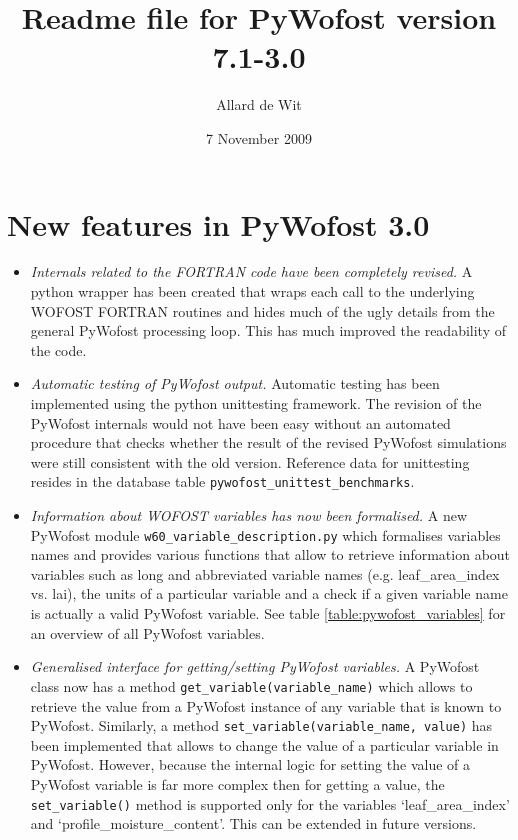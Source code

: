 \documentclass[12pt]{article}
\title{Readme file for PyWofost version 7.1-3.0}
\author{Allard de Wit}
\date{7 November 2009} %
\begin{document}
\maketitle
\tableofcontents

\section{New features in PyWofost 3.0}
\begin{itemize}
\item \emph{Internals related to the FORTRAN code have been completely revised.} A python wrapper has been created that wraps each call to the underlying WOFOST FORTRAN routines and hides much of the ugly details from the general PyWofost processing loop. This has much improved the readability of the code.
\item \emph{Automatic testing of PyWofost output.} Automatic testing has been implemented using the python unittesting framework. The revision of the PyWofost internals would not have been easy without an automated procedure that checks whether the result of the revised PyWofost simulations were still consistent with the old version. Reference data for unittesting resides in the database table \texttt{pywofost\_unittest\_benchmarks}.
\item \emph{Information about WOFOST variables has now been formalised.} A new PyWofost module \texttt{w60\_variable\_description.py} which formalises variables names and provides various functions that allow to retrieve information about variables such as long and abbreviated variable names (e.g. leaf\_area\_index vs. lai), the units of a particular variable and a check if a given variable name is actually a valid PyWofost variable. See table \ref{table:pywofost_variables} for an overview of all PyWofost variables.
\item \emph{Generalised interface for getting/setting PyWofost variables.} A PyWofost class now has a method \texttt{get\_variable(variable\_name)} which allows to retrieve the value from a PyWofost instance of any variable that is known to PyWofost. Similarly, a method \texttt{set\_variable(variable\_name, value)} has been implemented that allows to change the value of a particular variable in PyWofost. However, because the internal logic for setting the value of a PyWofost variable is far more complex then for getting a value, the  \texttt{set\_variable()} method is supported only for the variables `leaf\_area\_index' and `profile\_moisture\_content'. This can be extended in future versions.

\end{itemize}
\end{document}
